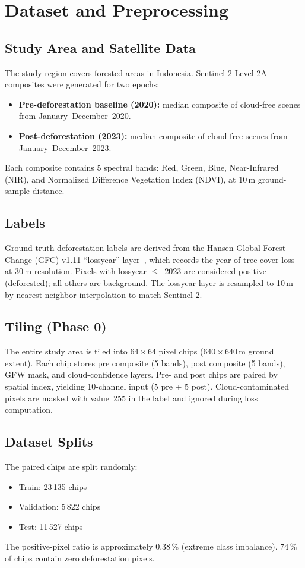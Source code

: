 \documentclass[twocolumn]{article}
\begin{document}
\section{Dataset and Preprocessing}

\subsection{Study Area and Satellite Data}
The study region covers forested areas in Indonesia.  Sentinel-2 
Level-2A composites were generated for two epochs:
\begin{itemize}
    \item \textbf{Pre-deforestation baseline (2020):} median 
          composite of cloud-free scenes from January--December~2020.
    \item \textbf{Post-deforestation (2023):} median composite of 
          cloud-free scenes from January--December~2023.
\end{itemize}
Each composite contains 5 spectral bands: Red, Green, Blue, 
Near-Infrared (NIR), and Normalized Difference Vegetation Index 
(NDVI), at 10\,m ground-sample distance.

\subsection{Labels}
Ground-truth deforestation labels are derived from the Hansen 
Global Forest Change (GFC) v1.11 ``lossyear'' layer~\cite{hansen}, 
which records the year of tree-cover loss at 30\,m resolution.  
Pixels with lossyear $\leq$~2023 are considered positive 
(deforested); all others are background.  The lossyear layer is 
resampled to 10\,m by nearest-neighbor interpolation to match 
Sentinel-2.

\subsection{Tiling (Phase 0)}
The entire study area is tiled into $64\times64$ pixel chips 
($640\times640$\,m ground extent).  Each chip stores pre 
composite (5 bands), post composite (5 bands), GFW mask, and 
cloud-confidence layers.  Pre- and post chips are paired by 
spatial index, yielding 10-channel input (5 pre + 5 post).  
Cloud-contaminated pixels are masked with value~255 in the label 
and ignored during loss computation.

\subsection{Dataset Splits}
The paired chips are split randomly:
\begin{itemize}
    \item Train: 23\,135 chips
    \item Validation: 5\,822 chips
    \item Test: 11\,527 chips
\end{itemize}
The positive-pixel ratio is approximately 0.38\,\% (extreme class 
imbalance).  74\,\% of chips contain zero deforestation pixels.
\end{document}
